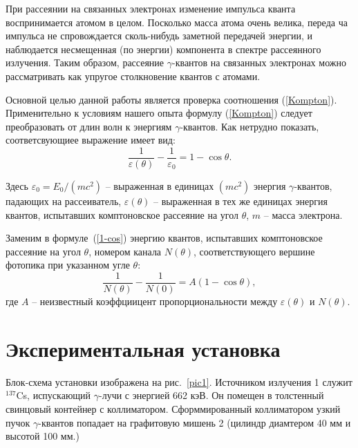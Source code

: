\documentclass[a4paper, 12pt]{article}%
\begin{document}
	При рассеянии на связанных электронах изменение импульса кванта воспринимается атомом в целом. Посколько масса атома очень велика, переда ча импульса не спровождается сколь-нибудь заметной передачей энергии, и наблюдается несмещенная (по энергии) компонента в спектре рассеянного излучения. Таким образом, рассеяние $\gamma$-квантов на связанных электронах можно рассматривать как упругое столкновение квантов с атомами.
	
	Основной целью данной работы является проверка соотношения (\ref{Kompton}). Применительно к условиям нашего опыта формулу (\ref{Kompton}) следует преобразовать от длин волн к энергиям $\gamma$-квантов. Как нетрудно показать, соответсвующиее выражение имеет вид:
	\begin{equation}\label{1-cos}
		\frac{1}{\varepsilon(\theta)} - \frac{1}{\varepsilon_0} = 1 - \cos \theta.
	\end{equation}

	Здесь $\varepsilon_0 = E_0/(mc^2)$ -- выраженная в единицах $(mc^2)$ энергия $\gamma$-квантов, падающих на рассеиватель, $\varepsilon(\theta)$ -- выраженная в тех же единицах энергия квантов, испытавших комптоновское рассеяние на угол $\theta$, $m$ -- масса электрона.
	
	Заменим в формуле~(\ref{1-cos}) энергию квантов, испытавших комптоновское рассеяние на угол $\theta$, номером канала $N(\theta)$, соответствующего вершине фотопика при указанном угле $\theta$:
	\begin{equation}\label{kek}
		\frac{1}{N(\theta)} - \frac{1}{N(0)} = A (1- \cos \theta),
	\end{equation}
	где $A$ -- неизвестный коэффциицент пропорциональности между $\varepsilon(\theta)$ и $N(\theta)$.
\newpage
\section{Экспериментальная установка}
	Блок-схема установки изображена на рис.~\ref{pic1}. Источником излучения 1 служит $^{137}$Cs, испускающий $\gamma$-лучи с энергией 662 кэВ. Он помещен в толстенный свинцовый контейнер с коллиматором. Сформмированный коллиматором узкий пучок $\gamma$-квантов попадает на графитовую мишень 2 (цилиндр диамтером 40 мм и высотой 100 мм.)
	
\end{document}
